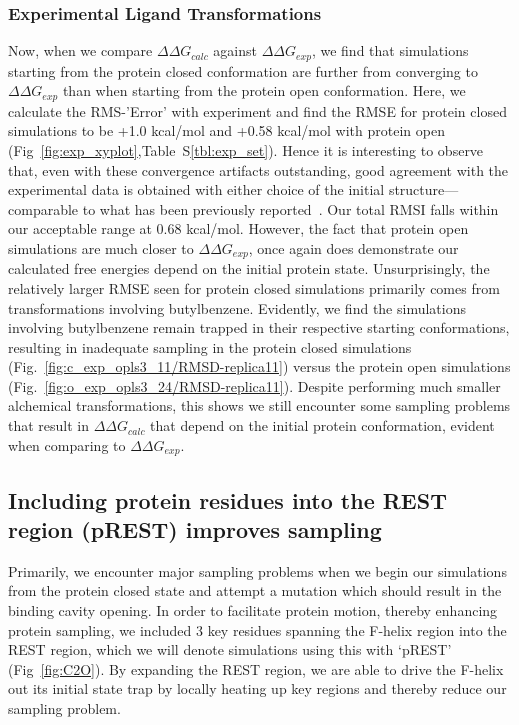 \documentclass[journal=jctcce,manuscript=article]{achemso}
\begin{document}
\subsubsection*{Experimental Ligand Transformations}
Now, when we compare $\Delta\Delta G_{calc}$ against $\Delta\Delta G_{exp}$, we find that simulations starting from the protein closed conformation are further from converging to $\Delta\Delta G_{exp}$ than when starting from the protein open conformation. 
Here, we calculate the RMS-'Error' with experiment and find the RMSE for protein closed simulations to be +1.0 kcal/mol and +0.58 kcal/mol with protein open (Fig~\ref{fig:exp_xyplot},Table~S\ref{tbl:exp_set}).
Hence it is interesting to observe that, even with these convergence artifacts outstanding, good agreement with the experimental data is obtained with either choice of the initial structure---comparable to what has been previously reported~\cite{FEPplus}.
Our total RMSI falls within our acceptable range at 0.68 kcal/mol.
However, the fact that protein open simulations are much closer to $\Delta\Delta G_{exp}$, once again does demonstrate our calculated free energies depend on the initial protein state.
Unsurprisingly, the relatively larger RMSE seen for protein closed simulations primarily comes from transformations involving butylbenzene.
Evidently, we find the simulations involving butylbenzene remain trapped in their respective starting conformations, resulting in inadequate sampling in the protein closed simulations (Fig.~\ref{fig:c_exp_opls3_11/RMSD-replica11}) versus the protein open simulations (Fig.~\ref{fig:o_exp_opls3_24/RMSD-replica11}).
Despite performing much smaller alchemical transformations, this shows we still encounter some sampling problems that result in $\Delta\Delta G_{calc}$ that depend on the initial protein conformation, evident when comparing to $\Delta\Delta G_{exp}$.

\subsection*{Including protein residues into the REST region (pREST) improves sampling}
Primarily, we encounter major sampling problems when we begin our simulations from the protein closed state and attempt a mutation which should result in the binding cavity opening.
In order to facilitate protein motion, thereby enhancing protein sampling, we included 3 key residues spanning the F-helix region into the REST region, which we will denote simulations using this with `pREST' (Fig~\ref{fig:C2O}).
By expanding the REST region, we are able to drive the F-helix out its initial state trap by locally heating up key regions and thereby reduce our sampling problem.
\end{document}
